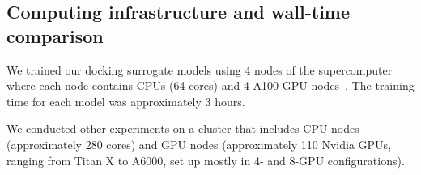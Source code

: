 























































































\subsection{{Computing infrastructure {and wall-time comparison}}}\label{app:computing_infrastructure}
We trained our docking surrogate models using 4 nodes of the supercomputer 
where each node contains CPUs (64 cores) and 4 A100 GPU nodes~\citep{Polaris}.
The training time for each model was approximately 3 hours.

We conducted other experiments on a cluster that includes CPU nodes (approximately 280 cores) and GPU nodes (approximately 110 Nvidia GPUs, ranging from Titan X to A6000, set up mostly in 4- and 8-GPU configurations). 

